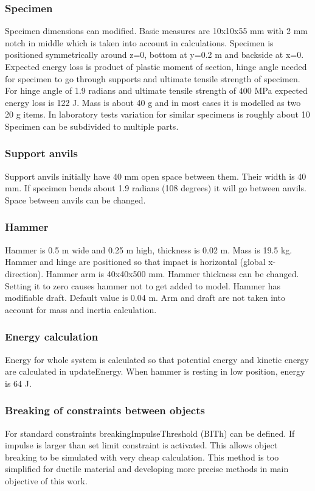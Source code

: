 \subsubsection{Specimen}
Specimen dimensions can modified. Basic measures are 10x10x55 mm with 2 mm notch in middle which is taken into account in calculations. Specimen is positioned symmetrically around z=0, bottom at y=0.2 m and backside at x=0. 
Expected energy loss is product of plastic moment of section, hinge angle needed for specimen to go through supports and 
ultimate tensile strength of specimen. For hinge angle of 1.9 radians and ultimate tensile strength of 400 MPa expected energy 
loss is 122 J. Mass is about 40 g and in most cases it is modelled as two 20 g items. In laboratory tests variation for similar 
specimens is roughly about 10 %
Specimen can be subdivided to multiple parts.

\subsubsection{Support anvils}
Support anvils initially have 40 mm open space between them. Their width is 40 mm. 
If specimen bends about 1.9 radians (108 degrees) it will go between anvils. Space between anvils can be changed.

\subsubsection{Hammer}
Hammer is 0.5 m wide and 0.25 m high, thickness is 0.02 m. Mass is 19.5 kg. Hammer and hinge are positioned so that 
impact is horizontal  (global x-direction). Hammer arm is 40x40x500 mm. Hammer thickness can be changed.
Setting it to zero causes hammer not to get added to model. Hammer has modifiable draft. Default value is 0.04 m. 
Arm and draft are not taken into account for mass and inertia calculation.

\subsubsection{Energy calculation}

Energy for whole system is calculated so that potential energy and kinetic energy are calculated in updateEnergy. 
When hammer is resting in low position, energy is 64 J. 

\subsubsection{Breaking of constraints between objects}
For standard \bullet constraints breakingImpulseThreshold (BITh) can be defined. If impulse is larger than set limit constraint is activated. 
This allows object breaking to be simulated with very cheap calculation. 
This method is too simplified for ductile material and developing more precise methods in main objective of this work.  

